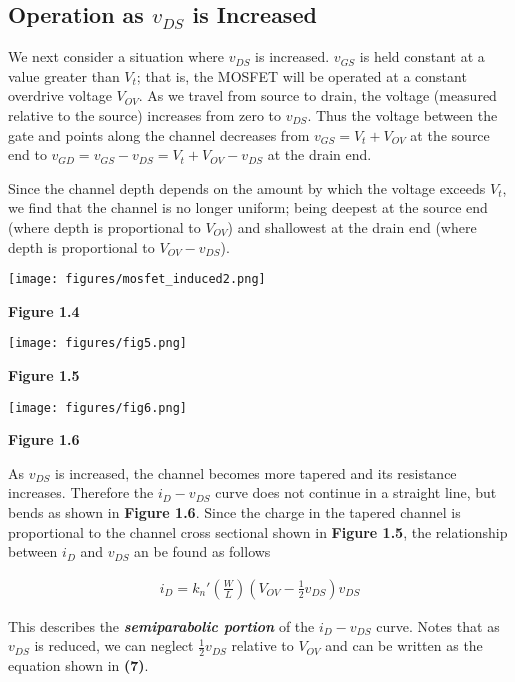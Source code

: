 \documentclass[12pt]{article}
\begin{document}
    \subsection*{Operation as $v_{DS}$ is Increased}

    We next consider a situation where $v_{DS}$ is increased. $v_{GS}$ is held
    constant at a value greater than $V_t$; that is, the MOSFET will be 
    operated at a constant overdrive voltage $V_{OV}$. As we travel from source
    to drain, the voltage (measured relative to the source) increases from zero
    to $v_{DS}$. Thus the voltage between the gate and points along the channel 
    decreases from $v_{GS} = V_t + V_{OV}$ at the source end to $v_{GD} = v_{GS} 
    - v_{DS} = V_t + V_{OV} - v_{DS}$ at the drain end.

    Since the channel depth depends on the amount by which the voltage exceeds 
    $V_t$, we find that the channel is no longer uniform; being deepest at the 
    source end (where depth is proportional to $V_{OV}$) and shallowest at 
    the drain end (where depth is proportional to $V_{OV} - v_{DS}$).

    \begin{center}
        \texttt{[image: figures/mosfet\_induced2.png]}
    \end{center}
    \textbf{Figure 1.4}
    \begin{center}
        \texttt{[image: figures/fig5.png]}
    \end{center}
    \textbf{Figure 1.5}
    \begin{center}
        \texttt{[image: figures/fig6.png]}
    \end{center}
    \textbf{Figure 1.6}

    As $v_{DS}$ is increased, the channel becomes more tapered and its resistance
    increases. Therefore the $i_D-v_{DS}$ curve does not continue in a straight 
    line, but bends as shown in \textbf{Figure 1.6}. Since the charge in the 
    tapered channel is proportional to the channel cross sectional shown in 
    \textbf{Figure 1.5}, the relationship between $i_D$ and $v_{DS}$ an be found
    as follows

    \begin{align}
        i_D = k_n'\left(\frac{W}{L}\right)\left(V_{OV} - \frac{1}{2}v_{DS}\right)v_{DS}
    \end{align} 

    This describes the \textit{\textbf{semiparabolic portion}} of the $i_D-v_{DS}$ curve.
    Notes that as $v_{DS}$ is reduced, we can neglect $\frac{1}{2}v_{DS}$ relative to 
    $V_{OV}$ and can be written as the equation shown in \textbf{(7)}.
\end{document}
